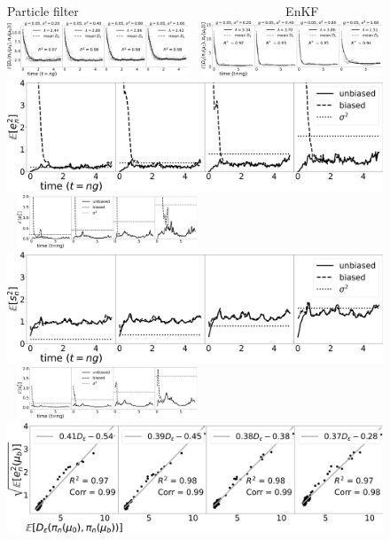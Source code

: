 \begin{figure}[t!]
\centering
Particle filter $\qquad \qquad \qquad \qquad \qquad \qquad \qquad \qquad $ EnKF\\
    \includegraphics[width=0.48\textwidth]{stability/plots/plots-bpf-effect of obs cov-rate_obs_cov_all.jpg} $\ \ $
    \includegraphics[width=0.48\textwidth]{stability/plots/plots-enkf-effect of ob cov-rate_all.jpg}\\
   \includegraphics[width=0.48\columnwidth]{stability/plots/plots-bpf-effect of obs cov-l2_obs_cov_all.jpg} $\ \ $
    \includegraphics[width=0.48\textwidth]{stability/plots/plots-enkf-effect of ob cov-mean_l2error_all.jpg}\\
   \includegraphics[width=0.48\columnwidth]{stability/plots/plots-bpf-effect of obs cov-trace_obs_cov_all.jpg} $\ \ $
    \includegraphics[width=0.48\textwidth]{stability/plots/plots-enkf-effect of ob cov-mean_trace_all.jpg}\\
   \includegraphics[width=0.48\columnwidth]{stability/plots/plots-bpf-effect of obs cov-dvl2_obs_cov_all.jpg} $\ \ $

\end{figure}
